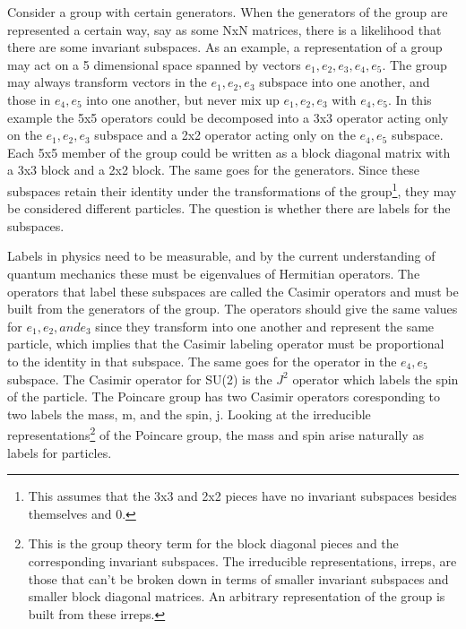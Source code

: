 Consider a group with certain generators. When the generators of the group are represented a certain way, say as some NxN matrices, there is a likelihood that there are some invariant subspaces. As an example, a representation of a group may act on a 5 dimensional space spanned by vectors $e_1, e_2, e_3, e_4, e_5$. The group may always transform vectors in the $e_1, e_2, e_3$ subspace into one another, and those in $e_4, e_5$ into one another, but never mix up $e_1, e_2, e_3$ with $e_4, e_5$. In this example the 5x5 operators could be decomposed into a 3x3 operator acting only on the $e_1, e_2, e_3$ subspace and a 2x2 operator acting only on the $e_4, e_5$ subspace. Each 5x5 member of the group could be written as a block diagonal matrix with a 3x3 block and a 2x2 block. The same goes for the generators. Since these subspaces retain their identity under the transformations of the group\footnote{This assumes that the 3x3 and 2x2 pieces have no invariant subspaces besides themselves and 0.}, they may be considered different particles. The question is whether there are labels for the subspaces.  

Labels in physics need to be measurable, and by the current understanding of quantum mechanics these must be eigenvalues of Hermitian operators. The operators that label these subspaces are called the Casimir operators and must be built from the generators of the group. The operators should give the same values for $e_1, e_2, and e_3$ since they transform into one another and represent the same particle, which implies that the Casimir labeling operator must be proportional to the identity in that subspace. The same goes for the operator in the $e_4, e_5$ subspace. The Casimir operator for SU(2) is the $J^2$ operator which labels the spin of the particle. The Poincare group has two Casimir operators coresponding to two labels the mass, m, and the spin, j. Looking at the irreducible representations\footnote{This is the group theory term for the block diagonal pieces and the corresponding invariant subspaces. The irreducible representations, irreps, are those that can't be broken down in terms of smaller invariant subspaces and smaller block diagonal matrices. An arbitrary representation of the group is built from these irreps.} of the Poincare group, the mass and spin arise naturally as labels for particles. 


